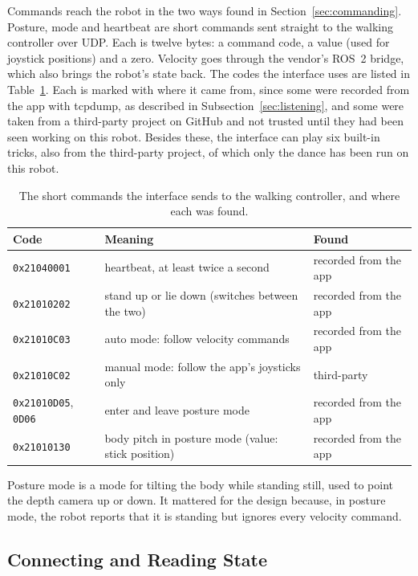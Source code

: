 Commands reach the robot in the two ways found in Section~\ref{sec:commanding}. Posture, mode and heartbeat
are short commands sent straight to the walking controller over UDP. Each is twelve bytes: a command code,
a value (used for joystick positions) and a zero. Velocity goes through the vendor's ROS~2 bridge, which also
brings the robot's state back. The codes the interface uses are listed in Table~\ref{tab:codes}. Each is
marked with where it came from, since some were recorded from the app with tcpdump, as described in
Subsection~\ref{sec:listening}, and some were taken from a third-party project on GitHub and not trusted
until they had been seen working on this robot. Besides these, the interface can play six built-in tricks,
also from the third-party project, of which only the dance has been run on this robot.

\begin{table}[htbp]
\centering
\caption{The short commands the interface sends to the walking controller, and where each was found.}
\label{tab:codes}
\begin{tabular}{@{}lll@{}}
\toprule
Code & Meaning & Found \\
\midrule
\texttt{0x21040001} & heartbeat, at least twice a second & recorded from the app \\
\texttt{0x21010202} & stand up or lie down (switches between the two) & recorded from the app \\
\texttt{0x21010C03} & auto mode: follow velocity commands & recorded from the app \\
\texttt{0x21010C02} & manual mode: follow the app's joysticks only & third-party \\
\texttt{0x21010D05}, \texttt{0D06} & enter and leave posture mode & recorded from the app \\
\texttt{0x21010130} & body pitch in posture mode (value: stick position) & recorded from the app \\
\bottomrule
\end{tabular}
\end{table}

Posture mode is a mode for tilting the body while standing still, used to point the depth camera up or
down. It mattered for the design because, in posture mode, the robot reports that it is standing but
ignores every velocity command.

\subsection{Connecting and Reading State}
\label{sec:state}

